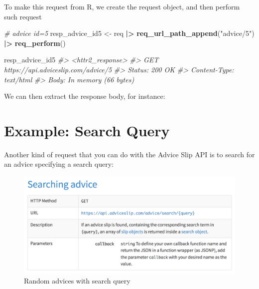 \documentclass[
]{book}
\newenvironment{Shaded}{\begin{snugshade}}{\end{snugshade}}
\newcommand{\CommentTok}[1]{\textcolor[rgb]{0.56,0.35,0.01}{\textit{#1}}}
\newcommand{\FunctionTok}[1]{\textcolor[rgb]{0.13,0.29,0.53}{\textbf{#1}}}
\newcommand{\NormalTok}[1]{#1}
\newcommand{\OtherTok}[1]{\textcolor[rgb]{0.56,0.35,0.01}{#1}}
\newcommand{\SpecialCharTok}[1]{\textcolor[rgb]{0.81,0.36,0.00}{\textbf{#1}}}
\newcommand{\StringTok}[1]{\textcolor[rgb]{0.31,0.60,0.02}{#1}}
\begin{document}
To make this request from R, we create the request object, and then perform
such request

\begin{Shaded}
\begin{Highlighting}[]
\CommentTok{\# advice id=5}
\NormalTok{resp\_advice\_id5 }\OtherTok{\textless{}{-}}\NormalTok{ req }\SpecialCharTok{|\textgreater{}}
  \FunctionTok{req\_url\_path\_append}\NormalTok{(}\StringTok{"advice/5"}\NormalTok{) }\SpecialCharTok{|\textgreater{}}
  \FunctionTok{req\_perform}\NormalTok{()}

\NormalTok{resp\_advice\_id5}
\CommentTok{\#\textgreater{} \textless{}httr2\_response\textgreater{}}
\CommentTok{\#\textgreater{} GET https://api.adviceslip.com/advice/5}
\CommentTok{\#\textgreater{} Status: 200 OK}
\CommentTok{\#\textgreater{} Content{-}Type: text/html}
\CommentTok{\#\textgreater{} Body: In memory (66 bytes)}
\end{Highlighting}
\end{Shaded}

We can then extract the response body, for instance:

\begin{Shaded}
\end{Shaded}

\hypertarget{example-search-query}{%
\section{Example: Search Query}\label{example-search-query}}

Another kind of request that you can do with the Advice Slip API is to search
for an advice specifying a search query:

\begin{figure}

{\centering \includegraphics[width=0.7\linewidth]{images/api/advice-slip-search} 

}

\caption{Random advices with search query}\label{fig:unnamed-chunk-134}
\end{figure}
\end{document}
